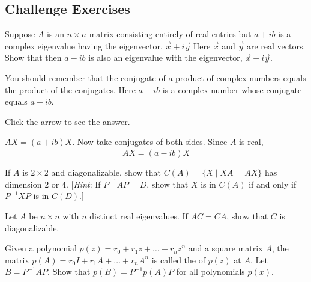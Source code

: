 \documentclass{ximera}
\begin{document}
\subsection*{Challenge Exercises}

\begin{problem}\label{prb:8.32} Suppose $A$ is an $n\times n$ matrix consisting entirely of real
entries but $a+ib$ is a complex eigenvalue having the eigenvector, $\vec{x}+i\vec{y}$ Here $\vec{x}$ and $\vec{y}$ are real vectors. Show
that then $a-ib$ is also an eigenvalue with the eigenvector, $\vec{x}-i\vec{y}$.

\begin{hint}
You should remember that the conjugate of a
product of complex numbers equals the product of the conjugates. Here $a+ib$
is a complex number whose conjugate equals $a-ib.$


Click the arrow to see the answer.
\begin{expandable}
$AX=\left(
a+ib\right)X$. Now take conjugates of both sides. Since $A$ is
real,
\[
A\overline{X}=\left( a-ib\right) \overline{X}
\]
\end{expandable}
 
\end{hint}
\end{problem}



\begin{problem}\label{prb:2x2diagonalizable}
If $A$ is $2 \times 2$ and diagonalizable, show that $C(A) = \{X \mid XA = AX\}$ has dimension $2$ or $4$. [\textit{Hint}: If $P^{-1}AP = D$, show that $X$ is in $C(A)$ if and only if $P^{-1}XP$ is in $C(D)$.]
\end{problem}

\begin{problem}\label{prob:real_ew_commuting}
Let $A$ be $n \times n$ with $n$ distinct real eigenvalues. If $AC = CA$, show that $C$ is diagonalizable.
\end{problem}

\begin{problem}\label{prob:similar_poly_eval}
Given a polynomial $p(z) = r_{0} + r_{1}z + \dots + r_{n}z^{n}$ and a square matrix $A$, the matrix $p(A) = r_{0}I + r_{1}A + \dots  + r_{n}A^{n}$ is called the  of $p(z)$ at $A$. Let $B = P^{-1}AP$. Show that $p(B) = P^{-1}p(A)P$ for all polynomials $p(x)$.
\end{problem}
\end{document}
